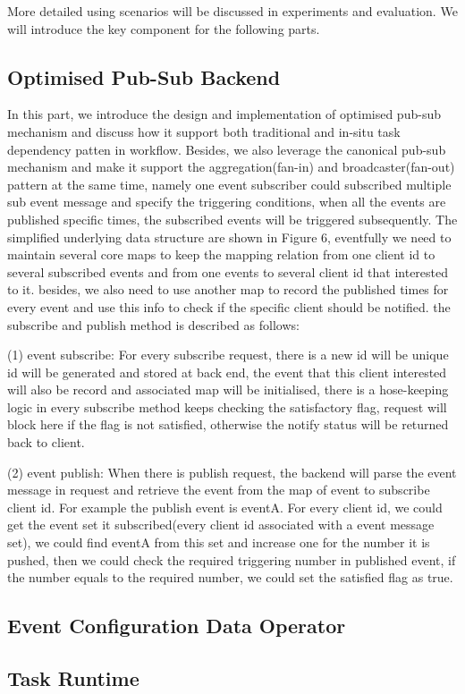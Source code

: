 More detailed using scenarios will be discussed in experiments and evaluation. We will introduce the key component for the following parts. 

\subsection{Optimised Pub-Sub Backend}

In this part, we introduce the design and implementation of optimised pub-sub mechanism and discuss how it support both traditional and in-situ task dependency patten in workflow. Besides, we also leverage the canonical pub-sub mechanism and make it support the aggregation(fan-in) and broadcaster(fan-out) pattern at the same time, namely one event subscriber could subscribed multiple sub event message and specify the triggering conditions, when all the events are published specific times, the subscribed events will be triggered subsequently. The  simplified underlying data structure are shown in Figure 6, eventfully we need to maintain several core maps to keep the mapping relation from one client id to several subscribed events and from one events to several client id that interested to it. besides, we also need to use another map to record the published times for every event and use this info to check if the specific client should be notified. the subscribe and publish method is described as follows:

(1) event subscribe: For every subscribe request, there is a new id will be unique id will be generated and stored at back end, the event that this client interested will also be record and associated map will be initialised, there is a hose-keeping logic in every subscribe method keeps checking the satisfactory flag, request will block here if the flag is not satisfied, otherwise the notify status will be returned back to client.

(2) event publish: When there is publish request, the backend will parse the event message in request and retrieve the event from the map of event to subscribe client id. For example the publish event is eventA. For every client id, we could get the event set it subscribed(every client id associated with a event message set), we could find eventA from this set and increase one for the number it is pushed, then we could check the required triggering number in published event, if the number equals to the required number, we could set the satisfied flag as true.

\subsection{Event Configuration Data Operator}


\subsection{Task Runtime}
